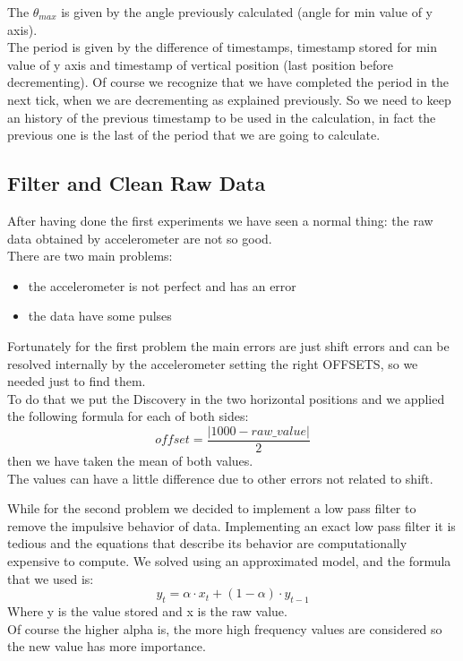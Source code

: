 The $\theta_{max}$ is given by the  angle previously calculated (angle for min value of y axis).\\
The period is given by the difference of timestamps, timestamp stored for min value of y axis and timestamp of vertical position (last position before decrementing).
Of course we recognize that we have completed the period in the next tick, when we are decrementing as explained previously. So we need to keep an history of the previous timestamp to be used in the calculation, in fact the previous one is the last of the period that we are going to calculate.

\subsection{Filter and Clean Raw Data}
After having done the first experiments we have seen a normal thing: the raw data obtained by accelerometer are not so good.\\
There are two main problems:
\begin{itemize}
	\item the accelerometer is not perfect and has an error
	\item the data have some pulses
\end{itemize} \par

Fortunately for the first problem the main errors are just shift errors and can be resolved internally by the accelerometer setting the right OFFSETS, so we needed just to find them.\\
To do that we put the Discovery in the two horizontal positions and we applied the following formula for each of both sides:
$$ offset = \frac{\left|1000-raw\_value\right|}{2}$$
then we have taken the mean of both values. \\
The values can have a little difference due to other errors not related to shift.\par

While for the second problem we decided to implement a low pass filter to remove the impulsive behavior of data. Implementing an exact low pass filter it is tedious and the equations that describe its behavior are computationally expensive to compute. We solved using an approximated model, and the formula \cite{Holt20045} that we used is:
$$ y_t = \alpha \cdot x_t + (1-\alpha) \cdot y_{t-1}$$
Where y is the value stored and x is the raw value.\\
Of course the higher alpha is, the more high frequency values are considered so the new value has more importance.\par

